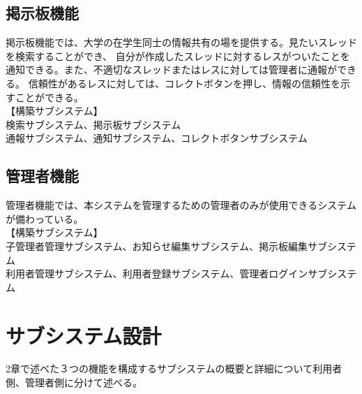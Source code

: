 \documentclass[a4j]{jarticle}
\begin{document}
\subsection{掲示板機能}
 掲示板機能では、大学の在学生同士の情報共有の場を提供する。見たいスレッドを検索することができ、
 自分が作成したスレッドに対するレスがついたことを通知できる。また、不適切なスレッドまたはレスに対しては管理者に通報ができる。
 信頼性があるレスに対しては、コレクトボタンを押し、情報の信頼性を示すことができる。
\\【構築サブシステム】
\\ 検索サブシステム、掲示板サブシステム
\\ 通報サブシステム、通知サブシステム、コレクトボタンサブシステム

\subsection{管理者機能}
 管理者機能では、本システムを管理するための管理者のみが使用できるシステムが備わっている。
\\【構築サブシステム】
\\ 子管理者管理サブシステム、お知らせ編集サブシステム、掲示板編集サブシステム
\\ 利用者管理サブシステム、利用者登録サブシステム、管理者ログインサブシステム

\section{サブシステム設計}
2章で述べた３つの機能を構成するサブシステムの概要と詳細について利用者側、管理者側に分けて述べる。
\end{document}
